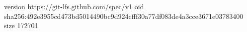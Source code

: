 version https://git-lfs.github.com/spec/v1
oid sha256:492e3955cd473bd5014490bc9d924cfff30a77df083de4a3cce3671e03783400
size 172701
